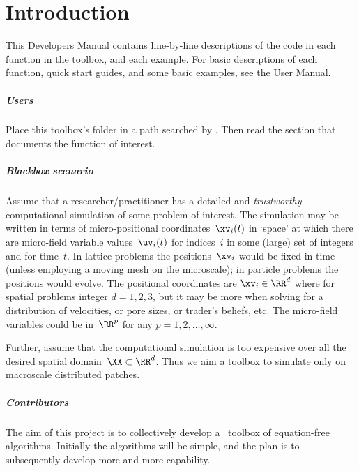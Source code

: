 \chapter{Introduction}

\localtableofcontents

\begin{devMan}
This Developers Manual contains line-by-line descriptions of the code in each function in the toolbox, and each example.  For basic descriptions of each function, quick start guides, and some basic examples, see the User Manual.
\end{devMan}

\paragraph{Users}
Place this toolbox's folder in a path searched by \script.
Then read the section that documents the function of interest.


\paragraph{Blackbox scenario}
Assume that a researcher\slash practitioner has a detailed and \emph{trustworthy} computational simulation of some problem of interest.
The simulation may be written in terms of micro-positional coordinates~\(\xv_i(t)\) in `space' at which there are micro-field variable values~\(\uv_i(t)\) for indices~\(i\) in some (large) set of integers and for time~\(t\).
In lattice problems the positions~\(\xv_i\) would be fixed in time (unless employing a moving mesh on the microscale); in particle problems the positions would evolve.
The positional coordinates are \(\xv_i\in\RR^{d}\) where for spatial problems integer \(d=1,2,3\), but it may be more when solving for a distribution of velocities, or pore sizes, or trader's beliefs, etc.
The micro-field variables could be in~\(\RR^{p}\) for any \(p=1,2,\ldots,\infty\).

Further, assume that the computational simulation is too expensive over all the desired spatial domain~\(\XX\subset\RR^{d}\).
Thus we aim a toolbox to simulate only on macroscale distributed patches.



\paragraph{Contributors}
The aim of this project is to collectively develop a \script\ toolbox of equation-free algorithms.
Initially the algorithms will be simple, and the plan is to subsequently develop more and more capability.

